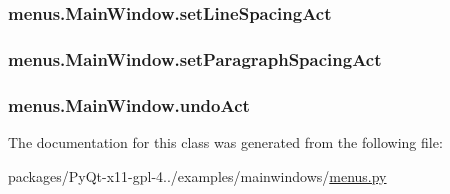 \subsubsection[{set\+Line\+Spacing\+Act}]{\setlength{\rightskip}{0pt plus 5cm}menus.\+Main\+Window.\+set\+Line\+Spacing\+Act}\label{classmenus_1_1MainWindow_a0527cb1817a3180971fb399bade24b35}
\hypertarget{classmenus_1_1MainWindow_a6056d26a7df5941a4f0549a034ebbe24}{}
\subsubsection[{set\+Paragraph\+Spacing\+Act}]{\setlength{\rightskip}{0pt plus 5cm}menus.\+Main\+Window.\+set\+Paragraph\+Spacing\+Act}\label{classmenus_1_1MainWindow_a6056d26a7df5941a4f0549a034ebbe24}
\hypertarget{classmenus_1_1MainWindow_a2e6f800d24293615ee092290167cf106}{}
\subsubsection[{undo\+Act}]{\setlength{\rightskip}{0pt plus 5cm}menus.\+Main\+Window.\+undo\+Act}\label{classmenus_1_1MainWindow_a2e6f800d24293615ee092290167cf106}


The documentation for this class was generated from the following file\+:\begin{DoxyCompactItemize}
\item 
packages/\+Py\+Qt-\/x11-\/gpl-\/4../examples/mainwindows/\hyperlink{menus_8py}{menus.\+py}\end{DoxyCompactItemize}
